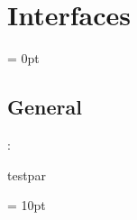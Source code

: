 
\section{Interfaces} 


\parskip = 0pt

\vspace{3mm} \subsection*{General}

: 

testpar
\vspace{2mm}

\vspace{5mm}\parskip = 10pt 
